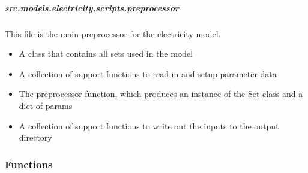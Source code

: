 \documentclass[letterpaper,10pt,english]{sphinxmanual}
\begin{document}
\subparagraph{src.models.electricity.scripts.preprocessor}
\label{\detokenize{src.models.electricity.scripts.preprocessor:module-src.models.electricity.scripts.preprocessor}}\label{\detokenize{src.models.electricity.scripts.preprocessor:src-models-electricity-scripts-preprocessor}}\label{\detokenize{src.models.electricity.scripts.preprocessor::doc}}
\sphinxAtStartPar
This file is the main preprocessor for the electricity model.
\begin{description}
\begin{itemize}
\item {} 
\sphinxAtStartPar
A class that contains all sets used in the model

\item {} 
\sphinxAtStartPar
A collection of support functions to read in and setup parameter data

\item {} 
\sphinxAtStartPar
The preprocessor function, which produces an instance of the Set class and a dict of params

\item {} 
\sphinxAtStartPar
A collection of support functions to write out the inputs to the output directory

\end{itemize}

\end{description}
\subsubsection*{Functions}
\end{document}
